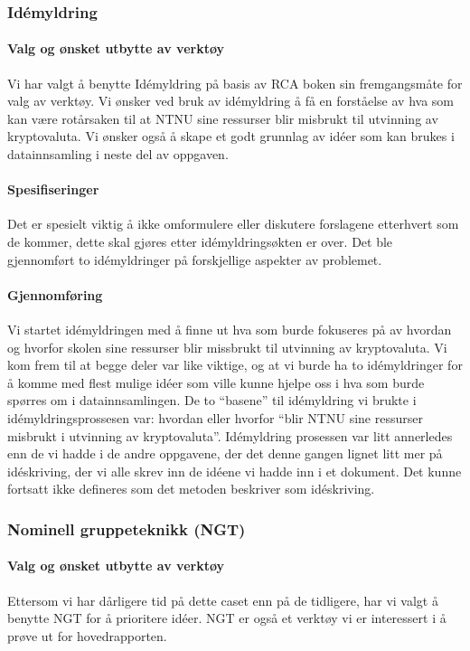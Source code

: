 \subsubsection{Idémyldring}
\paragraph{Valg og ønsket utbytte av verktøy}
Vi har valgt å benytte Idémyldring på basis av RCA boken \cite{RCA} sin fremgangsmåte for valg av verktøy. 
Vi ønsker ved bruk av idémyldring å få en forståelse av hva som kan være rotårsaken til at NTNU sine ressurser blir misbrukt til utvinning av kryptovaluta. Vi ønsker også å skape et godt grunnlag av idéer som kan brukes i datainnsamling i neste del av oppgaven.

\paragraph{Spesifiseringer}
Det er spesielt viktig å ikke omformulere eller diskutere forslagene etterhvert som de kommer, dette skal gjøres etter idémyldringsøkten er over. Det ble gjennomført to idémyldringer på forskjellige aspekter av problemet. 

\paragraph{Gjennomføring}
Vi startet idémyldringen med å finne ut hva som burde fokuseres på av hvordan og hvorfor skolen sine ressurser blir missbrukt til utvinning av kryptovaluta. Vi kom frem til at begge deler var like viktige, og at vi burde ha to idémyldringer for å komme med flest mulige idéer som ville kunne hjelpe oss i hva som burde spørres om i datainnsamlingen. De to ``basene'' til idémyldring vi brukte i idémyldringsprossesen var: hvordan eller hvorfor ``blir NTNU sine ressurser misbrukt i utvinning av kryptovaluta''. Idémyldring prosessen var litt annerledes enn de vi hadde i de andre oppgavene, der det denne gangen lignet litt mer på idéskriving, der vi alle skrev inn de idéene vi hadde inn i et dokument. Det kunne fortsatt ikke defineres som det metoden beskriver som idéskriving. 


\subsubsection{Nominell gruppeteknikk (NGT)}
\paragraph{Valg og ønsket utbytte av verktøy}
Ettersom vi har dårligere tid på dette caset enn på de tidligere, har vi valgt å benytte NGT for å prioritere idéer. NGT er også et verktøy vi er interessert i å prøve ut for hovedrapporten.

